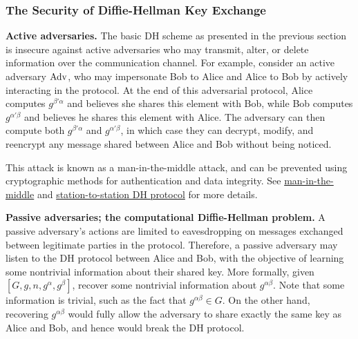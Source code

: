 \subsubsection{The Security of Diffie-Hellman Key Exchange}

{\bf Active adversaries.} The basic DH scheme as presented in the previous 
section is insecure against active adversaries who may transmit, alter, or delete 
information over the communication channel. For example, consider an active 
adversary ${\rm Adv}$, who may impersonate Bob to Alice and Alice to Bob by 
actively interacting in the protocol. At the end of this adversarial protocol, 
Alice computes $g^{\beta'\alpha}$ and believes she shares this element with Bob, 
while Bob computes $g^{\alpha'\beta}$ and believes he shares this element with 
Alice. The adversary can then compute both $g^{\beta'\alpha}$ and $g^{\alpha'\beta}$, 
in which case they can decrypt, modify, and reencrypt any message shared between 
Alice and Bob without being noticed. 

\begin{center}
\end{center}

This attack is known as a man-in-the-middle attack, and can be prevented using 
cryptographic methods for authentication and data integrity. See 
\href{https://en.wikipedia.org/wiki/Man-in-the-middle_attack}{man-in-the-middle}
and \href{https://en.wikipedia.org/wiki/Station-to-Station_protocol}
{station-to-station DH protocol} for more details. 

{\bf Passive adversaries; the computational Diffie-Hellman problem.} A passive 
adversary's actions are limited to eavesdropping on messages exchanged between 
legitimate parties in the protocol. Therefore, a passive adversary may listen to 
the DH protocol between Alice and Bob, with the objective of learning some 
nontrivial information about their shared key. More formally, given 
$[G, g, n, g^\alpha, g^\beta]$, recover some nontrivial information about 
$g^{\alpha\beta}$. Note that some information is trivial, such as the fact that 
$g^{\alpha\beta} \in G$. On the other hand, recovering $g^{\alpha\beta}$ would 
fully allow the adversary to share exactly the same key as Alice and Bob, 
and hence would break the DH protocol. 

